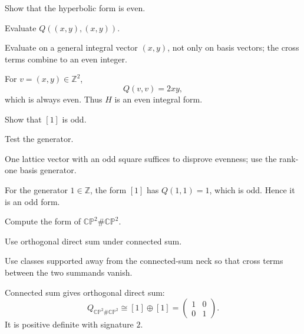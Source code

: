 \begin{exercise}\label{exr:viii34-07}
Show that the hyperbolic form is even.
\end{exercise}
\begin{hint}
Evaluate $Q((x,y),(x,y))$.

Evaluate on a general integral vector \((x,y)\), not only on basis vectors; the cross terms combine to an even integer.
\end{hint}
\begin{solution}
For \(v=(x,y)\in\mathbb Z^2\),
\[
Q(v,v)=2xy,
\]
which is always even. Thus \(H\) is an even integral form.
\end{solution}

\begin{exercise}\label{exr:viii34-08}
Show that $[1]$ is odd.
\end{exercise}
\begin{hint}
Test the generator.

One lattice vector with an odd square suffices to disprove evenness; use the rank-one basis generator.
\end{hint}
\begin{solution}
For the generator \(1\in\mathbb Z\), the form \([1]\) has \(Q(1,1)=1\), which is odd. Hence it is an odd form.
\end{solution}

\begin{exercise}\label{exr:viii34-09}
Compute the form of $\mathbb{CP}^2\#\mathbb{CP}^2$.
\end{exercise}
\begin{hint}
Use orthogonal direct sum under connected sum.

Use classes supported away from the connected-sum neck so that cross terms between the two summands vanish.
\end{hint}
\begin{solution}
Connected sum gives orthogonal direct sum:
\[
Q_{\mathbb{CP}^2\#\mathbb{CP}^2}\cong[1]\oplus[1]
=\begin{pmatrix}1&0\\0&1\end{pmatrix}.
\]
It is positive definite with signature \(2\).
\end{solution}

